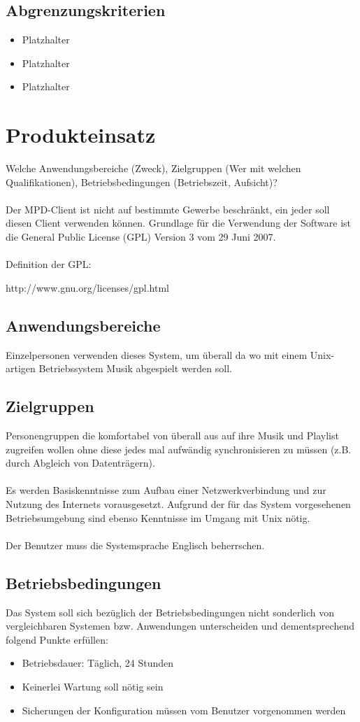 \subsection{Abgrenzungskriterien}
\begin{itemize}
		\item Platzhalter
		\item Platzhalter
		\item Platzhalter
\end{itemize}
\section{Produkteinsatz}
Welche Anwendungsbereiche (Zweck), Zielgruppen (Wer mit welchen Qualifikationen), Betriebsbedingungen (Betriebszeit,
Aufsicht)?\ \\ \\
Der MPD-Client ist nicht auf bestimmte Gewerbe beschränkt, ein jeder soll diesen Client
verwenden können. Grundlage für die Verwendung der Software ist die General Public License (GPL)
Version 3 vom 29 Juni 2007.\ \\ \\
Definition der GPL:
\begin{center}
http://www.gnu.org/licenses/gpl.html
\end{center}
\subsection{Anwendungsbereiche}
Einzelpersonen verwenden dieses System, um überall da wo mit 
einem Unix-artigen Betriebssystem Musik abgespielt werden soll.
\subsection{Zielgruppen}
Personengruppen die komfortabel von überall aus auf ihre Musik und Playlist zugreifen
wollen ohne diese jedes mal aufwändig synchronisieren zu müssen (z.B. durch Abgleich von Datenträgern).\ \\ \\
Es werden Basiskenntnisse zum Aufbau einer Netzwerkverbindung und zur Nutzung des Internets vorausgesetzt.
Aufgrund der für das System vorgesehenen Betriebsumgebung sind ebenso Kenntnisse im Umgang mit Unix nötig.\ \\ \\
Der Benutzer muss die Systemsprache Englisch beherrschen.
\subsection{Betriebsbedingungen}
Das System soll sich bezüglich der Betriebsbedingungen nicht sonderlich von vergleichbaren Systemen bzw.
Anwendungen unterscheiden und dementsprechend folgend Punkte erfüllen:
\begin{itemize}
	\item Betriebsdauer: Täglich, 24 Stunden
	\item Keinerlei Wartung soll nötig sein
	\item Sicherungen der Konfiguration müssen vom Benutzer vorgenommen werden
\end{itemize}

